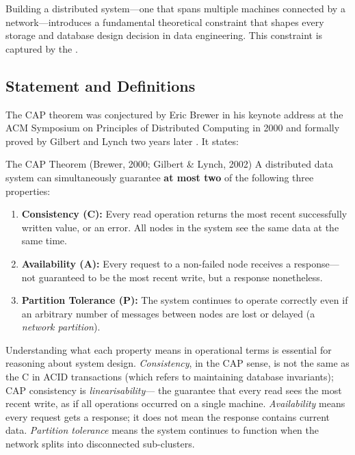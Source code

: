 Building a distributed system---one that spans multiple machines
connected by a network---introduces a fundamental theoretical constraint
that shapes every storage and database design decision in data
engineering. This constraint is captured by the .

\subsection{Statement and Definitions}
\label{subsec:cap-statement}

The CAP theorem was conjectured by Eric Brewer in his keynote address at
the ACM Symposium on Principles of Distributed Computing in 2000
\parencite{Brewer2000} and formally proved by Gilbert and Lynch two years
later \parencite{GilbertLynch2002}. It states:

\begin{defbox}{The CAP Theorem (Brewer, 2000; Gilbert \& Lynch, 2002)}
A distributed data system can simultaneously guarantee \textbf{at most
two} of the following three properties:
\begin{enumerate}
  \item \textbf{Consistency (C):} Every read operation returns the most
        recent successfully written value, or an error. All nodes in the
        system see the same data at the same time.
  \item \textbf{Availability (A):} Every request to a non-failed node
        receives a response---not guaranteed to be the most recent
        write, but a response nonetheless.
  \item \textbf{Partition Tolerance (P):} The system continues to
        operate correctly even if an arbitrary number of messages
        between nodes are lost or delayed (a \emph{network partition}).
\end{enumerate}
\end{defbox}

Understanding what each property means in operational terms is essential
for reasoning about system design. \emph{Consistency}, in the CAP sense,
is not the same as the C in ACID transactions (which refers to
maintaining database invariants); CAP consistency is \emph{linearisability}---
the guarantee that every read sees the most recent write, as if all
operations occurred on a single machine. \emph{Availability} means every
request gets a response; it does not mean the response contains current
data. \emph{Partition tolerance} means the system continues to function
when the network splits into disconnected sub-clusters.


